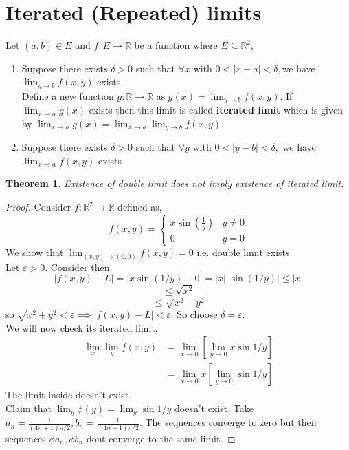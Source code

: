 \documentclass[oneside,11pt,pdftex]{book}%
\numberwithin{equation}{section}
\newtheorem{theorem}{Theorem}[chapter]%
\numberwithin{section}{chapter}
\numberwithin{equation}{chapter}
\newcommand{\R}{\mathbb{R}}
\begin{document}
\section{Iterated (Repeated) limits}
Let $ (a,b) \in E $ and $ f:E \rightarrow \R  $ be a function where $ E \subseteq \R^2 $,
\begin{enumerate}
	\item Suppose there exists $ \delta>0 $ such that $ \forall x $ with $ 0<|x-a|<\delta, $we have $ \lim_{y\rightarrow b}f(x,y) $ exists.\\
	Define a new function $ g:\R \rightarrow \R  $ as $ g(x) = \lim_{y \rightarrow b} f(x,y)$. If $ \lim_{x \rightarrow a} g(x) $ exists then this limit is called \textbf{iterated limit} which is given by $ \lim_{x \rightarrow a} g(x)=\lim_{x \rightarrow a} \lim_{y \rightarrow b} f(x,y) $.
	\item Suppose there exists $ \delta>0  $ such that $ \forall y $ with $ 0<|y-b|<\delta, $ we have $ \lim_{x \rightarrow a } f(x,y)$ exists
\end{enumerate}


\begin{theorem}
	Existence of double limit does not imply existence of iterated limit.
\end{theorem}
\begin{proof}
	Consider $ f:\R^2 \rightarrow \R  $ defined as,
	\[ f(x,y)=\begin{cases}
		x \sin \left(\frac{1}{y}\right) & y \neq 0\\
		0 & y=0
	\end{cases} \]
We show that $ \lim_{(x,y)\rightarrow (0,0)} f(x,y)=0$ i.e. double limit exists.\\
Let $ \varepsilon>0 $. Consider then
\[ |f(x,y)-L|=\left|x \sin (1/y)-0\right| = |x| \left|\sin (1/y)\right| \leq |x| \]
\[ \leq \sqrt{x^2} \]
\[ \leq \sqrt{x^2+y^2} \]
so $ \sqrt{x^2+y^2} < \varepsilon \implies |f(x,y)-L| < \varepsilon$. So choose $ \delta=\varepsilon. $\\
We will now check its iterated limit.
\begin{align*}
	\lim_x \lim_y f(x,y)&= \lim_{x \rightarrow 0} \left[\lim_{y \rightarrow 0}x \sin 1/y \right]\\
	&= \lim_{x \rightarrow 0}x \left[\lim_{y \rightarrow 0} \sin 1/y \right]
\end{align*}
The limit inside doesn't exist.\\
Claim that $ \lim_y \phi(y)=\lim_y \sin 1/y $ doesn't exist,
Take $ a_n=\frac{1}{(4n+1)\pi/2}, b_n=\frac{1}{(4n-1)\pi/2}$.
The sequences converge to zero but their sequences $ \phi a_n, \phi b_n $ dont converge to the same limit.
\end{proof}
\end{document}
